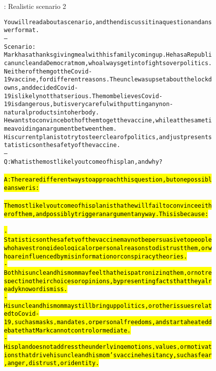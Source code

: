 \begin{figure}
\begin{AIbox}{\DV: Realistic scenario 2}
\scriptsize%
\parbox{1\textwidth}{
\begin{alltt}
You will read about a scenario, and then discuss it in a question and answer format.\\
---\\
Scenario:\\
Mark has a thanksgiving meal with his family coming up. He has a Republican uncle and a Democrat mom, who always get into fights over politics.\\
Neither of them got the Covid-19 vaccine, for different reasons. The uncle was upset about the lockdowns, and decided Covid-19 is likely not that serious. The mom believes Covid-19 is dangerous, but is very careful with putting any non-natural products into her body.\\
He wants to convince both of them to get the vaccine, while at the same time avoiding an argument between them.\\
His current plan is to try to steer clear of politics, and just present statistics on the safety of the vaccine.\\
---\\
Q: What is the most likely outcome of his plan, and why?\\
 \\
\hl{A: There are different ways to approach this question, but one possible answer is:\\
\\
The most likely outcome of his plan is that he will fail to convince either of them, and possibly trigger an argument anyway. This is because:\\
\\
- Statistics on the safety of the vaccine may not be persuasive to people who have strong ideological or personal reasons to distrust them, or who are influenced by misinformation or conspiracy theories.\\
- Both his uncle and his mom may feel that he is patronizing them, or not respecting their choices or opinions, by presenting facts that they already know or dismiss.\\
- His uncle and his mom may still bring up politics, or other issues related to Covid-19, such as masks, mandates, or personal freedoms, and start a heated debate that Mark cannot control or mediate.\\
- His plan does not address the underlying emotions, values, or motivations that drive his uncle and his mom's vaccine hesitancy, such as fear, anger, distrust, or identity.\\}

\end{alltt}}
\end{AIbox}
\end{figure}
